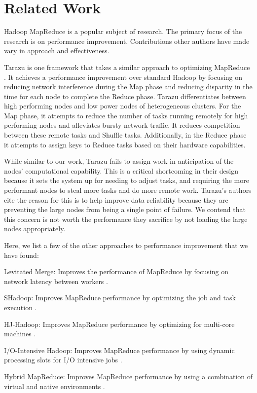 \section{Related Work}
\label{section:relatedwork}
Hadoop MapReduce is a popular subject of research. The primary focus of the research
is on performance improvement. Contributions other authors have made vary in
approach and effectiveness.

Tarazu is one framework that takes a similar approach to optimizing MapReduce \cite{Tarazu}. 
It achieves a performance improvement over standard Hadoop by focusing on reducing network
interference during the Map phase and reducing disparity in the time for each node to complete
the Reduce phase. Tarazu differentiates between high performing nodes and low power nodes of 
heterogeneous clusters. For the Map phase, it attempts to reduce the number of tasks running 
remotely for high performing nodes and alleviates bursty network traffic. It reduces competition 
between these remote tasks and Shuffle tasks. Additionally, in the Reduce phase it attempts to
assign keys to Reduce tasks based on their hardware capabilities.

While similar to our work, Tarazu fails to assign work in anticipation of the nodes' computational
capability. This is a critical shortcoming in their design because it sets the system up 
for needing to adjust tasks, and requiring the more performant nodes to steal more tasks 
and do more remote work. Tarazu's authors cite the reason for this is to help improve data 
reliability because they are preventing the large nodes from being a single point of failure. 
We contend that this concern is not worth the performance they sacrifice by not loading the 
large nodes appropriately. 

Here, we list a few of the other approaches to performance improvement that we have found:
\begin{description}
  \item{Levitated Merge:} Improves the performance of MapReduce by focusing on network latency between workers \cite{LevitatedMerge}.
  \item{SHadoop:} Improves MapReduce performance by optimizing the job and task execution \cite{SHadoop}.
  \item{HJ-Hadoop:} Improves MapReduce performance by optimizing for multi-core machines \cite{HJHadoop}.
  \item{I/O-Intensive Hadoop:} Improves MapReduce performance by using dynamic processing slots for I/O intensive jobs \cite{IOIntensiveHadoop}.
  \item{Hybrid MapReduce:} Improves MapReduce performance by using a combination of virtual and native environments \cite{HybridMR}.
\end{description}
